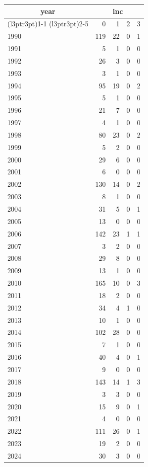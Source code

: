 \footnotesize\begin{tabular}[t]{lrrrr}
\toprule
\multicolumn{1}{c}{year} & \multicolumn{4}{c}{inc} \\
\cmidrule(l{3pt}r{3pt}){1-1} \cmidrule(l{3pt}r{3pt}){2-5}
  & 0 & 1 & 2 & 3\\
\midrule
1990 & 119 & 22 & 0 & 1\\
1991 & 5 & 1 & 0 & 0\\
1992 & 26 & 3 & 0 & 0\\
1993 & 3 & 1 & 0 & 0\\
1994 & 95 & 19 & 0 & 2\\
1995 & 5 & 1 & 0 & 0\\
1996 & 21 & 7 & 0 & 0\\
1997 & 4 & 1 & 0 & 0\\
1998 & 80 & 23 & 0 & 2\\
1999 & 5 & 2 & 0 & 0\\
2000 & 29 & 6 & 0 & 0\\
2001 & 6 & 0 & 0 & 0\\
2002 & 130 & 14 & 0 & 2\\
2003 & 8 & 1 & 0 & 0\\
2004 & 31 & 5 & 0 & 1\\
2005 & 13 & 0 & 0 & 0\\
2006 & 142 & 23 & 1 & 1\\
2007 & 3 & 2 & 0 & 0\\
2008 & 29 & 8 & 0 & 0\\
2009 & 13 & 1 & 0 & 0\\
2010 & 165 & 10 & 0 & 3\\
2011 & 18 & 2 & 0 & 0\\
2012 & 34 & 4 & 1 & 0\\
2013 & 10 & 1 & 0 & 0\\
2014 & 102 & 28 & 0 & 0\\
2015 & 7 & 1 & 0 & 0\\
2016 & 40 & 4 & 0 & 1\\
2017 & 9 & 0 & 0 & 0\\
2018 & 143 & 14 & 1 & 3\\
2019 & 3 & 3 & 0 & 0\\
2020 & 15 & 9 & 0 & 1\\
2021 & 4 & 0 & 0 & 0\\
2022 & 111 & 26 & 0 & 1\\
2023 & 19 & 2 & 0 & 0\\
2024 & 30 & 3 & 0 & 0\\
\bottomrule
\end{tabular}
